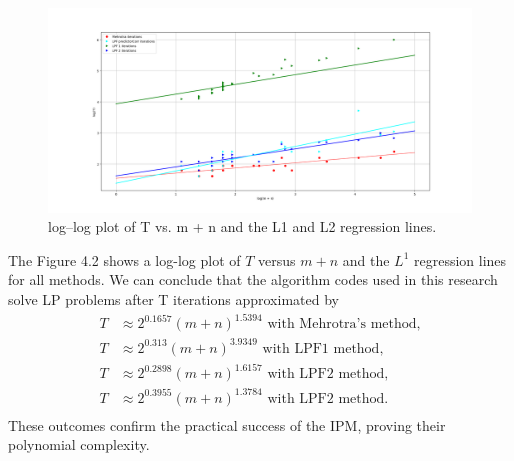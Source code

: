 \documentclass[a4paper,10 pt,titlepage,twoside]{book}
\theoremstyle{plain}
\theoremstyle{definition}
\theoremstyle{remark}
\begin{document}
\begin{figure}\label{figure:T}
	\begin{center}
		\includegraphics[width= 13 cm]{numberiterations}\caption{log–log plot of T vs. m + n and the L1 and L2
			regression lines.}
	\end{center}
\end{figure}
The Figure 4.2 shows a log-log plot of $T$ versus $m + n$ and the $L^{1}$ regression lines for all methods.
We can conclude that the algorithm codes used in this research solve LP problems after T iterations approximated by
\begin{align*}
T& \approx 2^{0.1657}(m + n)^{1.5394} \text{ with Mehrotra's method,}\\
T &\approx 2^{0.313}(m + n)^{3.9349} \text{ with LPF1 method,}\\
T& \approx 2^{0.2898}(m + n)^{1.6157} \text{ with LPF2 method,}\\
T& \approx 2^{0.3955}(m + n)^{1.3784} \text{ with LPF2 method.}\\
\end{align*}
These outcomes confirm the practical success of the IPM, proving their polynomial complexity. 
%
\end{document}
